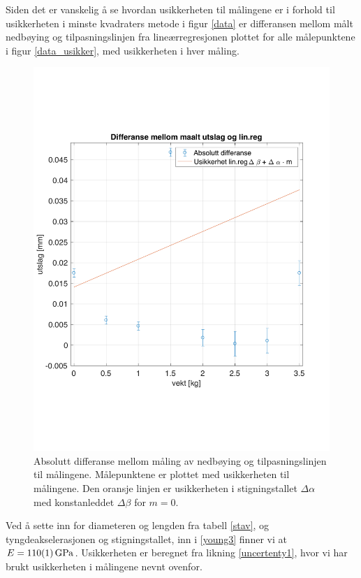 \documentclass[%
 reprint,
 amsmath,amssymb,
 aps,
 norsk,
 booktabs
]{revtex4-1}
\begin{document}
Siden det er vanskelig å se hvordan usikkerheten til målingene er i forhold til usikkerheten i minste kvadraters metode i figur \vref{data} er differansen mellom målt nedbøying og tilpasningslinjen fra lineærregresjonen plottet for alle målepunktene i figur \vref{data_usikker}, med usikkerheten i hver måling.
\begin{figure}[h!]
  \centering
  \includegraphics[scale=0.40]{usikkerhet_c.pdf}
  \caption{Absolutt differanse mellom måling av nedbøying og tilpasningslinjen til målingene. Målepunktene er plottet med usikkerheten til målingene. Den oransje linjen er usikkerheten i stigningstallet $\Delta \alpha$ med konstanleddet $\Delta \beta$ for $m=0$.}
  \label{data_usikker}
\end{figure}
Ved å sette inn for diameteren og lengden fra tabell \vref{stav}, og tyngdeakselerasjonen og stigningstallet, inn i \eqref{young3} finner vi at $E=\SI{110\pm1}{\giga\pascal}$. Usikkerheten er beregnet fra likning \eqref{uncertenty1}, hvor vi har brukt usikkerheten i målingene nevnt ovenfor.
\end{document}
